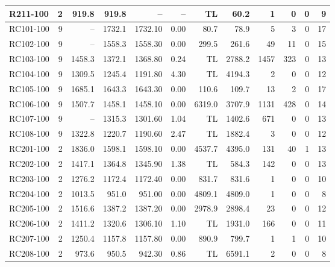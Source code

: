 \documentclass[10pt]{article}
\begin{document}
\begin{table}[p]
\begin{tabular}{lrrrrrrrrrrr}
R211-100 & 2 & 919.8 & 919.8 & -- & -- & TL & 60.2 & 1 & 0 & 0 & 9 \\
\midrule
RC101-100 & 9 & -- & 1732.1 & 1732.10 & 0.00 & 80.7 & 78.9 & 5 & 3 & 0 & 17 \\
RC102-100 & 9 & -- & 1558.3 & 1558.30 & 0.00 & 299.5 & 261.6 & 49 & 11 & 0 & 15 \\
RC103-100 & 9 & 1458.3 & 1372.1 & 1368.80 & 0.24 & TL & 2788.2 & 1457 & 323 & 0 & 13 \\
RC104-100 & 9 & 1309.5 & 1245.4 & 1191.80 & 4.30 & TL & 4194.3 & 2 & 0 & 0 & 12 \\
RC105-100 & 9 & 1685.1 & 1643.3 & 1643.30 & 0.00 & 110.6 & 109.7 & 13 & 2 & 0 & 17 \\
RC106-100 & 9 & 1507.7 & 1458.1 & 1458.10 & 0.00 & 6319.0 & 3707.9 & 1131 & 428 & 0 & 14 \\
RC107-100 & 9 & -- & 1315.3 & 1301.60 & 1.04 & TL & 1402.6 & 671 & 0 & 0 & 13 \\
RC108-100 & 9 & 1322.8 & 1220.7 & 1190.60 & 2.47 & TL & 1882.4 & 3 & 0 & 0 & 12 \\
\midrule
RC201-100 & 2 & 1836.0 & 1598.1 & 1598.10 & 0.00 & 4537.7 & 4395.0 & 131 & 40 & 1 & 13 \\
RC202-100 & 2 & 1417.1 & 1364.8 & 1345.90 & 1.38 & TL & 584.3 & 142 & 0 & 0 & 13 \\
RC203-100 & 2 & 1276.2 & 1172.4 & 1172.40 & 0.00 & 831.7 & 831.6 & 1 & 0 & 0 & 10 \\
RC204-100 & 2 & 1013.5 & 951.0 & 951.00 & 0.00 & 4809.1 & 4809.0 & 1 & 0 & 0 & 8 \\
RC205-100 & 2 & 1516.6 & 1387.2 & 1387.20 & 0.00 & 2978.9 & 2898.4 & 23 & 0 & 0 & 12 \\
RC206-100 & 2 & 1411.2 & 1320.6 & 1306.10 & 1.10 & TL & 1931.0 & 166 & 0 & 0 & 11 \\
RC207-100 & 2 & 1250.4 & 1157.8 & 1157.80 & 0.00 & 890.9 & 799.7 & 1 & 1 & 0 & 10 \\
RC208-100 & 2 & 973.6 & 950.5 & 942.30 & 0.86 & TL & 6591.1 & 2 & 0 & 0 & 8 \\
\bottomrule
\end{tabular}
\end{table}
\clearpage
\end{document}
